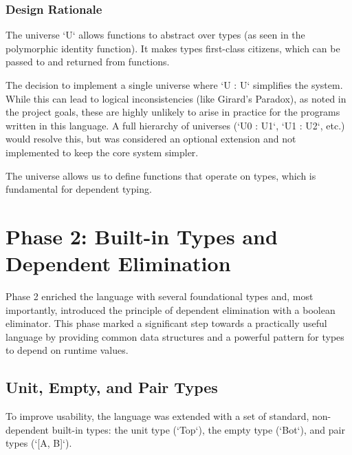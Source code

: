 \subsubsection{Design Rationale}
The universe `U` allows functions to abstract over types (as seen in the polymorphic identity function). It makes types first-class citizens, which can be passed to and returned from functions.

The decision to implement a single universe where `U : U` simplifies the system. While this can lead to logical inconsistencies (like Girard's Paradox), as noted in the project goals, these are highly unlikely to arise in practice for the programs written in this language. A full hierarchy of universes (`U0 : U1`, `U1 : U2`, etc.) would resolve this, but was considered an optional extension and not implemented to keep the core system simpler.

The universe allows us to define functions that operate on types, which is fundamental for dependent typing.

\section{Phase 2: Built-in Types and Dependent Elimination}

Phase 2 enriched the language with several foundational types and, most importantly, introduced the principle of dependent elimination with a boolean eliminator. This phase marked a significant step towards a practically useful language by providing common data structures and a powerful pattern for types to depend on runtime values.

\subsection{Unit, Empty, and Pair Types}

To improve usability, the language was extended with a set of standard, non-dependent built-in types: the unit type (`Top`), the empty type (`Bot`), and pair types (`[A, B]`).


